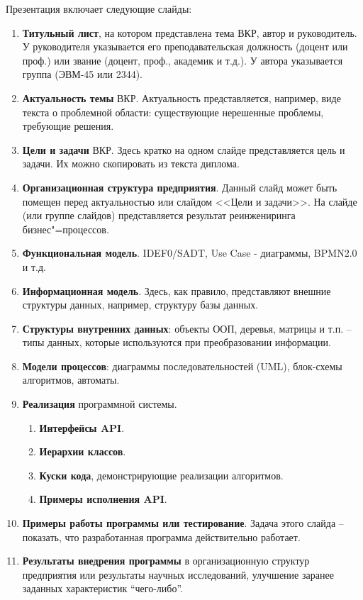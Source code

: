 \documentclass[a4paper,14pt,final]{extreport}
\begin{document}
Презентация включает следующие слайды:
\begin{enumerate}
\item \textbf{Титульный лист}, на котором представлена тема ВКР, автор и руководитель.  У руководителя указывается его преподавательская должность (доцент или проф.) или звание (доцент, проф., академик и т.д.).  У автора указывается группа (ЭВМ-45 или 2344).
\item \textbf{Актуальность темы} ВКР.  Актуальность представляется, например,  виде текста о проблемной области: существующие нерешенные проблемы, требующие решения.
\item \textbf{Цели и задачи} ВКР.  Здесь кратко на одном слайде представляется цель и задачи.  Их можно скопировать из текста диплома.
\item \textbf{Организационная структура предприятия}.  Данный слайд может быть помещен перед актуальностью или слайдом <<Цели и задачи>>.  На слайде (или группе слайдов) представляется результат реинжениринга бизнес"=процессов.
\item \textbf{Функциональная модель}. IDEF0/SADT, Use Case - диаграммы, BPMN2.0 и т.д.
\item \textbf{Информационная модель}.  Здесь, как правило, представляют внешние структуры данных, например, структуру базы данных.
\item \textbf{Структуры внутренних данных}: объекты ООП, деревья, матрицы и т.п. -- типы данных, которые используются при преобразовании информации.
\item \textbf{Модели процессов}: диаграммы последовательностей (UML), блок-схемы алгоритмов, автоматы.
\item \textbf{Реализация} программной системы.
  \begin{enumerate}
  \item \textbf{Интерфейсы API}.
  \item \textbf{Иерархии классов}.
  \item \textbf{Куски кода}, демонстрирующие реализации алгоритмов.
  \item \textbf{Примеры исполнения API}.
  \end{enumerate}
\item \textbf{Примеры работы программы или тестирование}.  Задача этого слайда -- показать, что разработанная программа действительно работает.
\item \textbf{Результаты внедрения программы} в организационную структур предприятия или результаты научных исследований, улучшение заранее заданных характеристик ``чего-либо''.

\end{enumerate}
\end{document}
